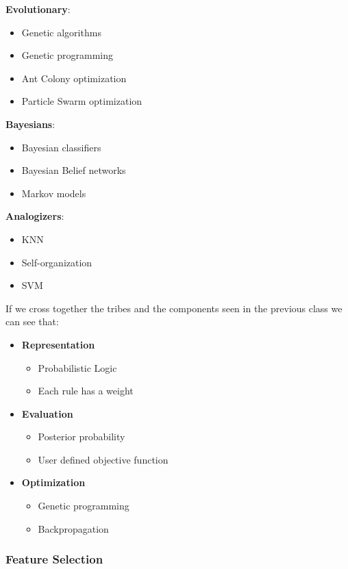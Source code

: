 \textbf{Evolutionary}:
\begin{itemize}
    \item Genetic algorithms
    \item Genetic programming
    \item Ant Colony optimization
    \item Particle Swarm optimization
\end{itemize}

\textbf{Bayesians}:
\begin{itemize}
    \item Bayesian classifiers
    \item Bayesian Belief networks
    \item Markov models
\end{itemize}

\textbf{Analogizers}:
\begin{itemize}
    \item KNN
    \item Self-organization
    \item SVM
\end{itemize}

If we cross together the tribes and the components seen in the previous class we can see that:

\begin{itemize}
    \item \textbf{Representation}
    \begin{itemize}
        \item Probabilistic Logic
        \item Each rule has a weight
    \end{itemize}
    \item \textbf{Evaluation}
    \begin{itemize}
        \item Posterior probability
        \item User defined objective function
    \end{itemize}
    \item \textbf{Optimization}
    \begin{itemize}
        \item Genetic programming
        \item Backpropagation
    \end{itemize}
\end{itemize}


\subsubsection{Feature Selection}

